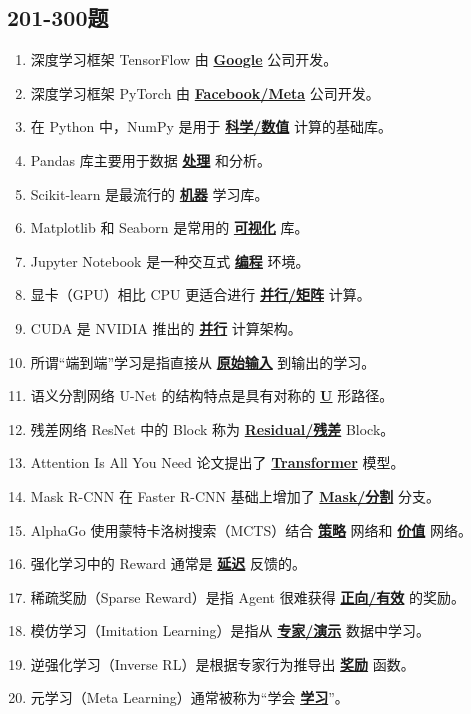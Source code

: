 \documentclass[12pt,a4paper,openany]{ctexbook}
\begin{document}
\subsection{201-300题}
\begin{enumerate}[resume,leftmargin=2em,itemsep=1pt]
\item 深度学习框架 TensorFlow 由 \underline{\textbf{Google}} 公司开发。
\item 深度学习框架 PyTorch 由 \underline{\textbf{Facebook/Meta}} 公司开发。
\item 在 Python 中，NumPy 是用于 \underline{\textbf{科学/数值}} 计算的基础库。
\item Pandas 库主要用于数据 \underline{\textbf{处理}} 和分析。
\item Scikit-learn 是最流行的 \underline{\textbf{机器}} 学习库。
\item Matplotlib 和 Seaborn 是常用的 \underline{\textbf{可视化}} 库。
\item Jupyter Notebook 是一种交互式 \underline{\textbf{编程}} 环境。
\item 显卡（GPU）相比 CPU 更适合进行 \underline{\textbf{并行/矩阵}} 计算。
\item CUDA 是 NVIDIA 推出的 \underline{\textbf{并行}} 计算架构。
\item 所谓“端到端”学习是指直接从 \underline{\textbf{原始输入}} 到输出的学习。
\item 语义分割网络 U-Net 的结构特点是具有对称的 \underline{\textbf{U}} 形路径。
\item 残差网络 ResNet 中的 Block 称为 \underline{\textbf{Residual/残差}} Block。
\item Attention Is All You Need 论文提出了 \underline{\textbf{Transformer}} 模型。
\item Mask R-CNN 在 Faster R-CNN 基础上增加了 \underline{\textbf{Mask/分割}} 分支。
\item AlphaGo 使用蒙特卡洛树搜索（MCTS）结合 \underline{\textbf{策略}} 网络和 \underline{\textbf{价值}} 网络。
\item 强化学习中的 Reward 通常是 \underline{\textbf{延迟}} 反馈的。
\item 稀疏奖励（Sparse Reward）是指 Agent 很难获得 \underline{\textbf{正向/有效}} 的奖励。
\item 模仿学习（Imitation Learning）是指从 \underline{\textbf{专家/演示}} 数据中学习。
\item 逆强化学习（Inverse RL）是根据专家行为推导出 \underline{\textbf{奖励}} 函数。
\item 元学习（Meta Learning）通常被称为“学会 \underline{\textbf{学习}}”。

\end{enumerate}
\end{document}
